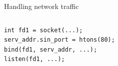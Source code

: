 \documentclass{beamer}
\begin{document}
\begin{frame}[fragile]{Handling network traffic}
\begin{columns}
\begin{column}[t]{0.5\textwidth}
\begin{verbatim}
int fd1 = socket(...);
serv_addr.sin_port = htons(80);
bind(fd1, serv_addr, ...);
listen(fd1, ...);
\end{verbatim}
\end{column}
\begin{column}[t]{0.5\textwidth}  %
    \begin{center}
\end{center}
\end{column}
\end{columns}
\end{frame}
\end{document}
